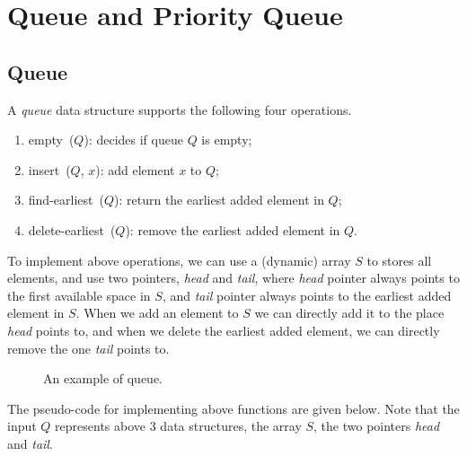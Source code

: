 \setcounter{definition}{0} \setcounter{property}{0} \setcounter{claim}{0} \setcounter{fact}{0} \setcounter{corollary}{0} \setcounter{figure}{0}

\section{Queue and Priority Queue}
\subsection*{Queue}

A \emph{queue} data structure supports the following four operations.
\vspace*{-\topsep}
\begin{enumerate}
\item empty~($Q$): decides if queue $Q$ is empty;
\item insert~($Q$, $x$): add element $x$ to $Q$;
\item find-earliest~($Q$): return the earliest added element in $Q$;
\item delete-earliest~($Q$): remove the earliest added element in $Q$.
\end{enumerate}

To implement above operations, we can use a (dynamic) array $S$ to stores all elements,
and use two pointers, \emph{head} and \emph{tail}, where \emph{head} pointer always points
to the first available space in $S$, and \emph{tail} pointer always points to the 
earliest added element in $S$. When we add an element to $S$ we can directly
add it to the place \emph{head} points to, and when we delete the earliest added
element, we can directly remove the one \emph{tail} points to.

\begin{figure}[h!]
\centering{}
\caption{An example of queue.}
\end{figure}

The pseudo-code for implementing above functions are given below. Note
that the input $Q$ represents above 3 data structures, the array $S$, the two pointers \emph{head} and \emph{tail}. 

\begin{minipage}{0.8\textwidth}
	\xxx
	\xxx
	\xxx
	\xxx
\end{minipage}

\begin{minipage}{0.8\textwidth}
	\xxx
	\xxx
	\xxx
	\xxx
\end{minipage}


